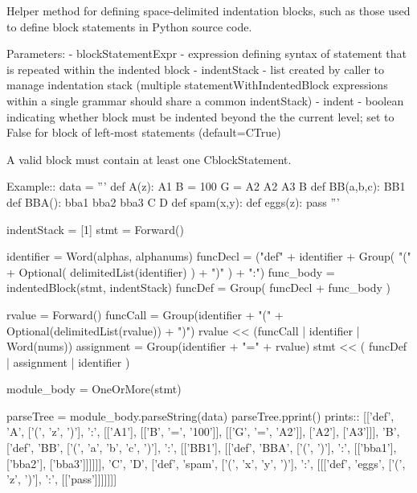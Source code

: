 \begin{DoxyVerb}Helper method for defining space-delimited indentation blocks, such as
those used to define block statements in Python source code.

Parameters:
 - blockStatementExpr - expression defining syntax of statement that
        is repeated within the indented block
 - indentStack - list created by caller to manage indentation stack
        (multiple statementWithIndentedBlock expressions within a single grammar
        should share a common indentStack)
 - indent - boolean indicating whether block must be indented beyond the
        the current level; set to False for block of left-most statements
        (default=C{True})

A valid block must contain at least one C{blockStatement}.

Example::
    data = '''
    def A(z):
      A1
      B = 100
      G = A2
      A2
      A3
    B
    def BB(a,b,c):
      BB1
      def BBA():
        bba1
        bba2
        bba3
    C
    D
    def spam(x,y):
         def eggs(z):
             pass
    '''


    indentStack = [1]
    stmt = Forward()

    identifier = Word(alphas, alphanums)
    funcDecl = ("def" + identifier + Group( "(" + Optional( delimitedList(identifier) ) + ")" ) + ":")
    func_body = indentedBlock(stmt, indentStack)
    funcDef = Group( funcDecl + func_body )

    rvalue = Forward()
    funcCall = Group(identifier + "(" + Optional(delimitedList(rvalue)) + ")")
    rvalue << (funcCall | identifier | Word(nums))
    assignment = Group(identifier + "=" + rvalue)
    stmt << ( funcDef | assignment | identifier )

    module_body = OneOrMore(stmt)

    parseTree = module_body.parseString(data)
    parseTree.pprint()
prints::
    [['def',
      'A',
      ['(', 'z', ')'],
      ':',
      [['A1'], [['B', '=', '100']], [['G', '=', 'A2']], ['A2'], ['A3']]],
     'B',
     ['def',
      'BB',
      ['(', 'a', 'b', 'c', ')'],
      ':',
      [['BB1'], [['def', 'BBA', ['(', ')'], ':', [['bba1'], ['bba2'], ['bba3']]]]]],
     'C',
     'D',
     ['def',
      'spam',
      ['(', 'x', 'y', ')'],
      ':',
      [[['def', 'eggs', ['(', 'z', ')'], ':', [['pass']]]]]]] 
\end{DoxyVerb}
 \mbox{\label{namespacepkg__resources_1_1__vendor_1_1pyparsing_a6984cb03a561daf44e2ee3dcdbf72fac}} 
